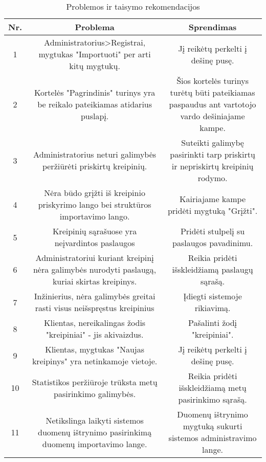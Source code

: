 		\begin{table}[ht] 
		\caption{Problemos ir taisymo rekomendacijos} %
		\centering %
			\begin{tabular}{c c c} %
		\hline\hline %
		Nr. & Problema & Sprendimas\\ [0.5ex] %
		\hline %
		1 & Administratorius>Registrai, mygtukas "Importuoti" per arti kitų mygtukų. & Jį reikėtų perkelti į dešinę pusę.\\ %
		2 & Kortelės "Pagrindinis" turinys yra be reikalo pateikiamas atidarius puslapį. & Šios kortelės turinys turėtų būti pateikiamas paspaudus ant vartotojo vardo dešiniajame kampe.\\%
		3 & Administratorius neturi galimybės peržiūrėti priskirtų kreipinių. & Suteikti galimybę pasirinkti tarp priskirtų ir nepriskirtų kreipinių rodymo.\\ %
		4 & Nėra būdo grįžti iš kreipinio priskyrimo lango bei struktūros importavimo lango. & Kairiajame kampe pridėti mygtuką "Grįžti".\\ %
		5 & Kreipinių sąrašuose yra neįvardintos paslaugos & Pridėti stulpelį su paslaugos pavadinimu.\\%
		6 & Administratoriui kuriant kreipinį nėra galimybės nurodyti paslaugą, kuriai skirtas kreipinys. & Reikia pridėti išskleidžiamą paslaugų sąrašą.\\%
		7 & Inžinierius, nėra galimybės greitai rasti visus neišspręstus kreipinius & Įdiegti sistemoje rikiavimą.\\ %
		8 & Klientas, nereikalingas žodis "kreipiniai" - jis akivaizdus. & Pašalinti žodį "kreipiniai".\\%
		9 & Klientas, mygtukas "Naujas kreipinys" yra netinkamoje vietoje. & Jį reikėtų perkelti į dešinę pusę.\\%
		10 & Statistikos peržiūroje trūksta metų pasirinkimo galimybės. & Reikia pridėti išskleidžiamą metų pasirinkimo sąrašą.\\ %
		11 & Netikslinga laikyti sistemos duomenų ištrynimo pasirinkimą duomenų importavimo lange. & Duomenų ištrynimo mygtuką sukurti sistemos administravimo lange.\\%
		\hline %
		\end{tabular} 
		\label{table:rekomendacijos} %
		\end{table} 
	
